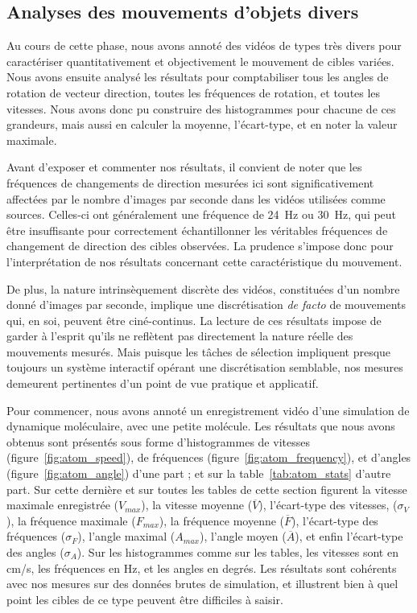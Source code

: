 	\subsection{Analyses des mouvements d'objets divers}
	Au cours de cette phase, nous avons annoté des vidéos de types très divers pour caractériser quantitativement et objectivement le mouvement de cibles variées. Nous avons ensuite analysé les résultats pour comptabiliser tous les angles de rotation de vecteur direction, toutes les fréquences de rotation, et toutes les vitesses. Nous avons donc pu construire des histogrammes pour chacune de ces grandeurs, mais aussi en calculer la moyenne, l'écart-type, et en noter la valeur maximale.
	
	Avant d'exposer et commenter nos résultats, il convient de noter que les fréquences de changements de direction mesurées ici sont significativement affectées par le nombre d'images par seconde dans les vidéos utilisées comme sources. Celles-ci ont généralement une fréquence de 24~Hz ou 30~Hz, qui peut être insuffisante pour correctement échantillonner les véritables fréquences de changement de direction des cibles observées. La prudence s'impose donc pour l'interprétation de nos résultats concernant cette caractéristique du mouvement.
	
	De plus, la nature intrinsèquement discrète des vidéos, constituées d'un nombre donné d'images par seconde, implique une discrétisation \emph{de facto} de mouvements qui, en soi, peuvent être ciné-continus. La lecture de ces résultats impose de garder à l'esprit qu'ils ne reflètent pas directement la nature réelle des mouvements mesurés. Mais puisque les tâches de sélection impliquent presque toujours un système interactif opérant une discrétisation semblable, nos mesures demeurent pertinentes d'un point de vue pratique et applicatif.
	
	Pour commencer, nous avons annoté un enregistrement vidéo d'une simulation de dynamique moléculaire, avec une petite molécule. Les résultats que nous avons obtenus sont présentés sous forme d'histogrammes de vitesses (figure~\ref{fig:atom_speed}), de fréquences (figure~\ref{fig:atom_frequency}), et d'angles (figure~\ref{fig:atom_angle}) d'une part ; et sur la table~\ref{tab:atom_stats} d'autre part. Sur cette dernière et sur toutes les tables de cette section figurent la vitesse maximale enregistrée ($V_{max}$), la vitesse moyenne ($\overline{V}$), l'écart-type des vitesses, ($\sigma_{V}$), la fréquence maximale ($F_{max}$), la fréquence moyenne ($\overline{F}$), l'écart-type des fréquences ($\sigma_{F}$), l'angle maximal ($A_{max}$), l'angle moyen ($\overline{A}$), et enfin l'écart-type des angles ($\sigma_{A}$). Sur les histogrammes comme sur les tables, les vitesses sont en cm/s, les fréquences en Hz, et les angles en degrés. Les résultats sont cohérents avec nos mesures sur des données brutes de simulation, et illustrent bien à quel point les cibles de ce type peuvent être difficiles à saisir.
	
